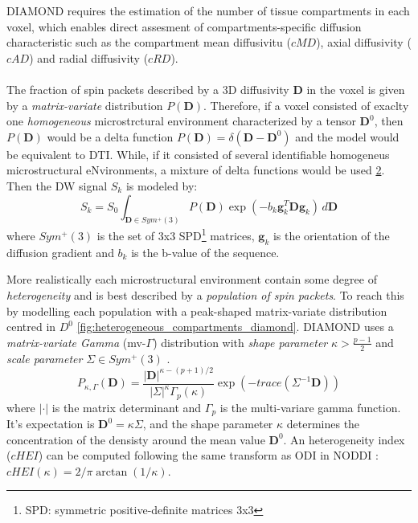  \begin{figure}[h]
   \centering
   \caption{}
   \label{fig:multicompartment}
 \end{figure}

 DIAMOND requires the estimation of the number of tissue compartments in each voxel, which enables direct assesment of compartments-specific diffusion characteristic such as the compartment mean diffusivitu ($cMD$), axial diffusivity ($cAD$) and radial diffusivity ($cRD$). 
 \\\\
 The fraction of spin packets described by a 3D diffusivity $\mathbf{D}$ in the voxel is given by a \emph{matrix-variate} distribution $P(\mathbf{D})$. Therefore, if a voxel consisted of exaclty one \emph{homogeneous} microstrctural environment characterized by a tensor $\mathbf{D}^0$, then $P(\mathbf{D})$ would be a delta function $P(\mathbf{D})=\delta(\mathbf{D}-\mathbf{D}^0)$ and the model would be equivalent to DTI. While, if it consisted of several identifiable homogeneus microstructural eNvironments, a mixture of delta functions would be used \cite{scherrer2016diamond} \ref{fig:homogeneous_compartments_diamond}. Then the DW signal $S_k$ is modeled by:
 \begin{equation}\label{eq:1.26}
   S_k = S_0 \int_{\mathbf{D}\in Sym^{+}(3)} P(\mathbf{D})\exp(-b_k\mathbf{g}_k^T\mathbf{D}\mathbf{g}_k) \,d\mathbf{D}
 \end{equation}
 where $Sym^{+}(3)$ is the set of 3x3 SPD\footnote{SPD: symmetric positive-definite matrices 3x3} matrices, $\mathbf{g}_k$ is the orientation of the diffusion gradient and $b_k$ is the b-value of the sequence.

 \begin{figure}[h]
   \centering
   \caption{}
   \label{fig:homogeneous_compartments_diamond}
 \end{figure}

 More realistically each microstructural environment contain some degree of \emph{heterogeneity} and is best described by a \emph{population of spin packets}. To reach this by modelling each population with a peak-shaped matrix-variate distribution centred in $D^0$ \ref{fig:heterogeneous_compartments_diamond}. DIAMOND uses a \emph{matrix-variate Gamma} (mv-$\Gamma$) distribution with \emph{shape parameter} $\kappa > \frac{p-1}{2}$ and \emph{scale parameter} $\Sigma \in Sym^{+}(3)$ \cite{scherrer2016diamond}.
 \begin{equation}
   P_{\kappa,\Gamma}(\mathbf{D}) = \frac{|\mathbf{D}|^{\kappa-(p+1)/2}}{|\Sigma|^\kappa \Gamma_p(\kappa)}\exp (-trace(\Sigma^{-1}\mathbf{D}))
 \end{equation}
 where $|\cdot|$ is the matrix determinant and $\Gamma_p$ is the multi-variare gamma function. It's expectation is $\mathbf{D}^0=\kappa\Sigma$, and the shape parameter $\kappa$ determines the concentration of the densisty around the mean value $\mathbf{D}^0$. An heterogeneity index ($cHEI$) can be computed following the same transform as ODI in NODDI \cite{zhang2012noddi}: $cHEI(\kappa) = 2/\pi \arctan (1/\kappa)$.

